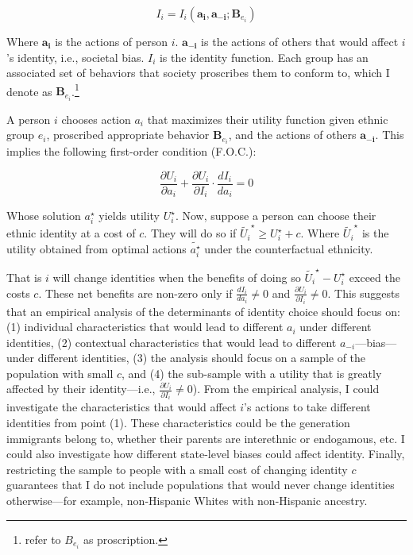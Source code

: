 \documentclass[12pt,english]{article}
\begin{document}
\begin{equation}
I_i = I_i(\pmb{a_i}, \pmb{a_{-i}}; \pmb{B}_{e_{i}})\label{eq:identity}
\end{equation}

Where $\pmb{a_i}$ is the actions of person $i$. $\pmb{a_{-i}}$ is the actions of others that would affect $i$'s identity, i.e., societal bias. $I_i$ is the identity function. Each group has an associated set of behaviors that society proscribes them to conform to, which I denote as $\pmb{B}_{e_{i}}$.\footnote{\textcite{akerlofEconomicsIdentity2000} refer to $B_{e_{i}}$ as proscription.}

A person $i$ chooses action $a_i$ that maximizes their utility function given ethnic group $e_i$, proscribed appropriate behavior $\pmb{B}_{e_{i}}$, and the actions of others $\pmb{a_{-i}}$. This implies the following first-order condition (F.O.C.):

\begin{equation}
\frac{\partial U_i}{\partial a_i} + \frac{\partial U_i}{\partial I_i} \cdot \frac{d I_i}{d a_i} = 0\label{eq:foc}
\end{equation}

Whose solution $a_{i}^{\star}$ yields utility $U_{i}^{\star}$. Now, suppose a person can choose their ethnic identity at a cost of $c$. They will do so if $\tilde{U_{i}}^{\star} \geq  U_{i}^{\star} + c$. Where $\tilde{U_{i}}^{\star}$ is the utility obtained from optimal actions $\tilde{a_i^{\star}}$ under the counterfactual ethnicity. 

That is $i$ will change identities when the benefits of doing so $\tilde{U_{i}}^{\star} - U_{i}^{\star}$ exceed the costs $c$. These net benefits are non-zero only if $\frac{d I_i}{d a_i} \neq 0$ and $\frac{\partial U_i}{\partial I_i} \neq 0$. This suggests that an empirical analysis of the determinants of identity choice should focus on: (1) individual characteristics that would lead to different $a_i$ under different identities, (2) contextual characteristics that would lead to different $a_{-i}$---bias---under different identities, (3) the analysis should focus on a sample of the population with small $c$, and (4) the sub-sample with a utility that is greatly affected by their identity---i.e., $\frac{\partial U_i}{\partial I_i} \neq 0$). From the empirical analysis, I could investigate the characteristics that would affect $i$'s actions to take different identities from point (1). These characteristics could be the generation immigrants belong to, whether their parents are interethnic or endogamous, etc. I could also investigate how different state-level biases could affect identity. Finally, restricting the sample to people with a small cost of changing identity $c$ guarantees that I do not include populations that would never change identities otherwise---for example, non-Hispanic Whites with non-Hispanic ancestry.
\end{document}
